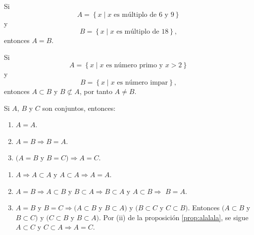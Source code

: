 \begin{examplebox}{}{}
    Si
    $$A = \left\{ x \mid x \text{ es múltiplo de } 6 \text{ y } 9 \right\}$$
    y
    $$B = \left\{ x \mid x \text{ es múltiplo de } 18 \right\},$$
    entonces $A = B$.
\end{examplebox}

\newpage

\begin{examplebox}{}{}
    Si
    $$A = \left\{ x \mid x \text{ es número primo y } x>2 \right\}$$
    y
    $$B = \left\{ x \mid x \text{ es número impar} \right\},$$
    entonces $A \subset B$ y $B \not\subset A$, por tanto $A \neq B$.
\end{examplebox}

\begin{prop}{}{}
    Si $A$, $B$ y $C$ son conjuntos, entonces:
    \begin{enumerate}[label=\roman*., topsep=6pt, itemsep=0pt]
        \item $A = A$.
        \item $A = B \Longrightarrow B = A$.
        \item $(A = B$ y $B = C) \Longrightarrow A = C$.
    \end{enumerate}
    \tcblower
    \demostracion
    \begin{enumerate}[label=\roman*., topsep=6pt, itemsep=0pt]
        \item $A \Longrightarrow A \subset A$ y $A \subset A \Longrightarrow A=A$.
        \item $A=B \Longrightarrow A \subset B$ y $B \subset A \Longrightarrow B \subset A$ y $A \subset B \Longrightarrow$ $B=A$.
        \item $A=B$ y $B=C \Longrightarrow(A \subset B$ y $B \subset A)$ y $(B \subset C$ y $C \subset B)$. Entonces $(A \subset B$ y $B \subset C)$ y $(C \subset B$ y $B \subset A)$. Por (ii) de la proposición \ref{prop:alalala}, se sigue $A \subset C$ y $C \subset A \Longrightarrow A=C$.
    \end{enumerate}
\end{prop}

